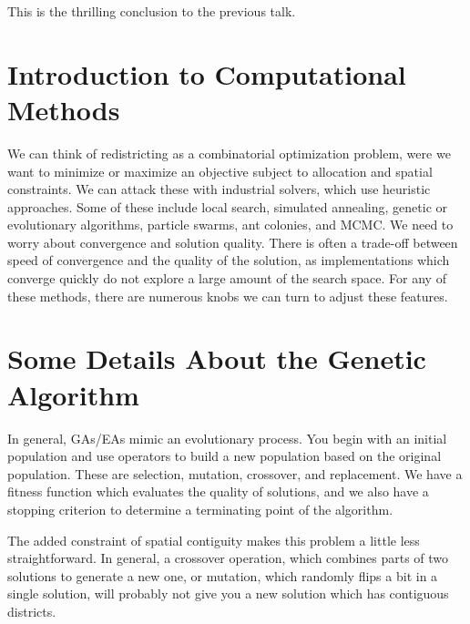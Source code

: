 




This is the thrilling conclusion to the previous talk.

\section*{Introduction to Computational Methods} 



We can think of redistricting as a combinatorial optimization problem, were we want to minimize or maximize an objective subject to allocation and spatial constraints.  We can attack these with industrial solvers, which use heuristic approaches.  Some of these include local search, simulated annealing, genetic or evolutionary algorithms, particle swarms, ant colonies, and MCMC.  We need to worry about convergence and solution quality.  There is often a trade-off between speed of convergence and the quality of the solution, as implementations which converge quickly do not explore a large amount of the search space.  For any of these methods, there are numerous knobs we can turn to adjust these features.


\section*{Some Details About the Genetic Algorithm}

In general, GAs/EAs mimic an evolutionary process.  You begin with an initial population and use operators to build a new population based on the original population.  These are selection, mutation, crossover, and replacement.  We have a fitness function which evaluates the quality of solutions, and we also have a stopping criterion to determine a terminating point of the algorithm.

The added constraint of spatial contiguity makes this problem a little less straightforward.  In general, a crossover operation, which combines parts of two solutions to generate a new one, or mutation, which randomly flips a bit in a single solution, will probably not give you a new solution which has contiguous districts.

